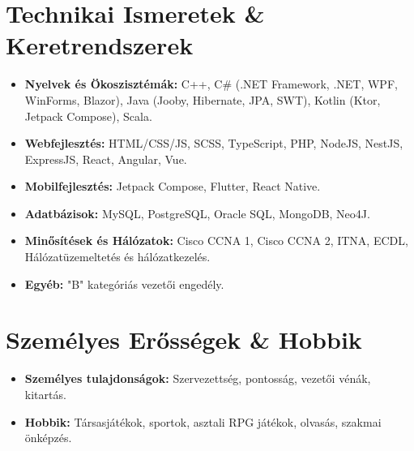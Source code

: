 \documentclass[11pt,a4paper]{article}
\begin{document}
\section{Technikai Ismeretek \& Keretrendszerek}
\begin{itemize}[leftmargin=0pt, label={}]
    \item \textbf{Nyelvek és Ökoszisztémák:} C++, C\# (.NET Framework, .NET, WPF, WinForms, Blazor), Java (Jooby, Hibernate, JPA, SWT), Kotlin (Ktor, Jetpack Compose), Scala.
    \item \textbf{Webfejlesztés:} HTML/CSS/JS, SCSS, TypeScript, PHP, NodeJS, NestJS, ExpressJS, React, Angular, Vue.
    \item \textbf{Mobilfejlesztés:} Jetpack Compose, Flutter, React Native.
    \item \textbf{Adatbázisok:} MySQL, PostgreSQL, Oracle SQL, MongoDB, Neo4J.
    \item \textbf{Minősítések és Hálózatok:} Cisco CCNA 1, Cisco CCNA 2, ITNA, ECDL, Hálózatüzemeltetés és hálózatkezelés.
    \item \textbf{Egyéb:} "B" kategóriás vezetői engedély.
\end{itemize}

\section{Személyes Erősségek \& Hobbik}
\begin{itemize}[leftmargin=0pt, label={}]
    \item \textbf{Személyes tulajdonságok:} Szervezettség, pontosság, vezetői vénák, kitartás. 
    \item \textbf{Hobbik:} Társasjátékok, sportok, asztali RPG játékok, olvasás, szakmai önképzés.
\end{itemize}
\end{document}
